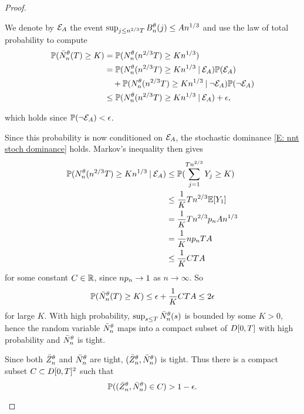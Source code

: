 \begin{proof}
\begin{proofpart}
We denote by $\mathcal{E}_{A}$ the event $\sup_{j \leq n^{2 / 3}T} B_n^{\theta}(j) \leq An^{1 / 3}$ and use the law of total probability to compute
\begin{equation} \label{E: First Total Probability Argument}
\begin{aligned}
\mathbb{P}(\bar{N}_n^{\theta}(T) \geq K) 
&= \mathbb{P}(N_n^{\theta}(n^{2 / 3}T) \geq Kn^{1 / 3}) \\
&=  \mathbb{P}(N_n^{\theta}(n^{2 / 3}T) \geq Kn^{1 / 3} \: | \: \mathcal{E}_{A}) \mathbb{P}(\mathcal{E}_{A}) \\
&\quad + \mathbb{P}(N_n^{\theta}(n^{2 / 3}T) \geq Kn^{1 / 3} \: | \: \neg\mathcal{E}_{A}) \mathbb{P}(\neg \mathcal{E}_{A}) \\
&\leq \mathbb{P}(N_n^{\theta}(n^{2 / 3}T) \geq Kn^{1 / 3} \: | \: \mathcal{E}_{A}) + \epsilon, \\
\end{aligned}	
\end{equation}

which holds since $\mathbb{P}(\neg\mathcal{E}_{A}) <\epsilon$.

Since this probability is now conditioned on $\mathcal{E}_{A}$, the stochastic dominance \eqref{E: nnt stoch dominance} holds.
Markov's inequality then gives
\begin{align*}
\mathbb{P}(N_n^{\theta}(n^{2 / 3}T) \geq Kn^{1 / 3} \: | \: \mathcal{E}_{A}) 
&\leq \mathbb{P}( \sum_{j=1}^{Tn^{2 / 3}} Y_j \geq K) \\
&\leq \frac{1}{K}Tn^{2 / 3} \mathbb{E}[Y_1] \\
&= \frac{1}{K}Tn^{2 / 3} p_n An^{1 / 3} \\
&= \frac{1}{K}np_n TA \\
&\leq \frac{1}{K}CTA
\end{align*}
for some constant $C \in \mathbb{R}$, since $np_n \rightarrow 1$ as $n \rightarrow \infty$.
So
\begin{equation}
\mathbb{P}(\bar{N}_n^{\theta}(T) \geq K) \leq \epsilon + \frac{1}{K}CTA \leq 2 \epsilon
\end{equation}
for large $K$.
With high probability, $\sup_{s \leq T}\bar{N}_n^{\theta}(s)$ is bounded by some $K>0$,
hence the random variable $\bar{N}_n^{\theta}$ maps into a compact subset of $D[0, T]$ with high probability and $\bar{N}_n^{\theta}$ is tight.

Since both $\bar{Z}^{\theta}_n$ and $\bar{N}_n^{\theta}$ are tight, $(\bar{Z}^{\theta}_n, \bar{N}_n^{\theta})$ is tight.
Thus there is a compact subset $C \subset D[0, T]^2$ such that
\begin{equation}
	\mathbb{P}( (\bar{Z}^{\theta}_n, \bar{N}_n^{\theta}) \in C) > 1 - \epsilon.
\end{equation}
\end{proofpart}




\end{proof}
